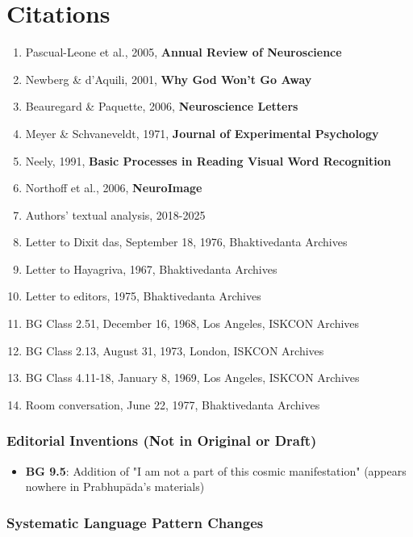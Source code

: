 \documentclass[11pt,twoside]{book}
\begin{document}
\part*{Citations}
\label{sec:org8188905}
\thispagestyle{plain}

\begin{enumerate}
\item Pascual-Leone et al., 2005, \textbf{Annual Review of Neuroscience}
\item Newberg \& d'Aquili, 2001, \textbf{Why God Won't Go Away}
\item Beauregard \& Paquette, 2006, \textbf{Neuroscience Letters}
\item Meyer \& Schvaneveldt, 1971, \textbf{Journal of Experimental Psychology}
\item Neely, 1991, \textbf{Basic Processes in Reading Visual Word Recognition}
\item Northoff et al., 2006, \textbf{NeuroImage}
\item Authors' textual analysis, 2018-2025
\item Letter to Dixit das, September 18, 1976, Bhaktivedanta Archives
\item Letter to Hayagriva, 1967, Bhaktivedanta Archives
\item Letter to editors, 1975, Bhaktivedanta Archives
\item BG Class 2.51, December 16, 1968, Los Angeles, ISKCON Archives
\item BG Class 2.13, August 31, 1973, London, ISKCON Archives
\item BG Class 4.11-18, January 8, 1969, Los Angeles, ISKCON Archives
\item Room conversation, June 22, 1977, Bhaktivedanta Archives
\end{enumerate}
\section*{Editorial Inventions (Not in Original or Draft)}
\label{sec:org21a08b3}
\begin{itemize}
\item \textbf{\textbf{BG 9.5}}: Addition of "I am not a part of this cosmic manifestation" (appears nowhere in Prabhupāda's materials)
\end{itemize}
\section*{Systematic Language Pattern Changes}
\label{sec:org2587536}
\end{document}
